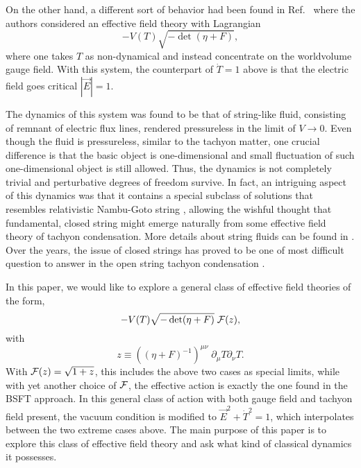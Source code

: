 \documentclass[a4paper,12pt]{article}
\begin{document}
On the other hand, a different sort of behavior had been found in 
Ref.~\cite{fluid}
where the authors considered an effective field theory with Lagrangian
\cite{potential}
\begin{equation}
-V(T)\sqrt{-\det (\eta+F)},
\end{equation}
where one takes $T$ as non-dynamical and instead concentrate on 
the worldvolume gauge field. With this system, the counterpart of
$\dot T=1$ above is that the electric field goes critical $|\vec E|=1$.

The dynamics of this system was found to
be that of string-like fluid, consisting of remnant of electric
flux lines, rendered pressureless in the limit of $V\rightarrow 0$.
Even though the fluid is pressureless, similar to the tachyon matter,
one crucial difference is that the basic object is one-dimensional
and small fluctuation of such one-dimensional object is still
allowed. Thus, the dynamics is not completely trivial and 
perturbative degrees of freedom survive. In fact, an
intriguing aspect of this dynamics was that it contains a special
subclass of solutions that resembles relativistic Nambu-Goto string
\cite{fluid,followup},
allowing the  wishful thought that fundamental, closed string might 
emerge naturally from some effective field theory of tachyon 
condensation. More details about string fluids can be found in
\cite{Gibbons2}. Over the years, the issue of closed strings has proved
to be one of most difficult question to answer in the open string
tachyon condensation \cite{fluid,yi,conf,shenker}.

In this paper, we would like to explore a general class of effective
field theories  of the form,
\begin{equation}
-V(T)\sqrt {-\det (\eta+F)}\;{\cal F}(z),
\end{equation}
with 
\begin{equation}
z\equiv ((\eta+F)^{-1})^{\mu\nu}\;\partial_\mu T\partial_\nu T.
\end{equation}
With ${\cal F}(z)=\sqrt{1+z}$, this includes the above two cases
as special limits, while with yet another choice of ${\cal F}$, the
effective action is exactly the one found in the  BSFT approach. In this
general class of action with both gauge field and tachyon field
present, the vacuum condition is modified to $\vec E^2+\dot T^2=1$,
which interpolates between the two extreme cases above. The
main purpose of this paper is to explore this class of 
effective field theory and ask what kind of classical dynamics
it possesses. 
\end{document}
